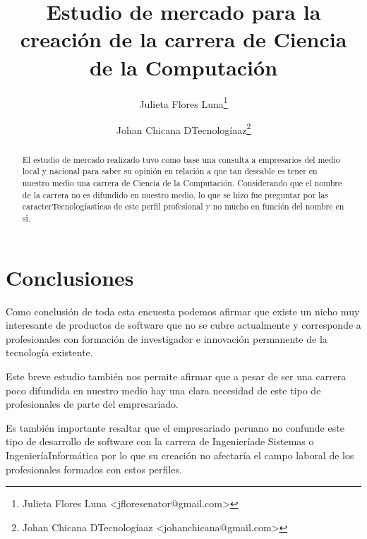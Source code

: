 \documentclass[a4paper,10pt]{article}
\title{Estudio de mercado para la creación de la carrera de Ciencia de la Computación}
\author{Julieta Flores Luna\footnote{Julieta Flores Luna <jfloresenator@gmail.com>}
\and Johan Chicana DTecnologíaaz\footnote{Johan Chicana DTecnologíaaz <johanchicana@gmail.com>}}
\begin{document}
\maketitle

\begin{abstract}
El estudio de mercado realizado tuvo como base una consulta a empresarios del medio local y nacional para saber su opinión en relación a que tan deseable es tener en nuestro medio una carrera de Ciencia de la Computación. Considerando que el nombre de la carrera no es difundido en nuestro medio, lo que se hizo fue preguntar por las caracterTecnologíasticas de este perfil profesional y no mucho en función del nombre en si.
\end{abstract}





\section{Conclusiones}
Como conclusión de toda esta encuesta podemos afirmar que existe un nicho muy interesante de productos de software que no se cubre actualmente y corresponde a profesionales con formación de investigador e innovación permanente de la tecnología existente.

Este breve estudio también nos permite afirmar que a pesar de ser una carrera poco difundida en nuestro medio hay una clara necesidad de este tipo de profesionales de parte del empresariado.

Es también importante resaltar que el empresariado peruano no confunde este tipo de desarrollo de software con la carrera de Ingenieríade Sistemas o IngenieríaInformática por lo que su creación no afectaría el campo laboral de los profesionales formados con estos perfiles.
\end{document}
